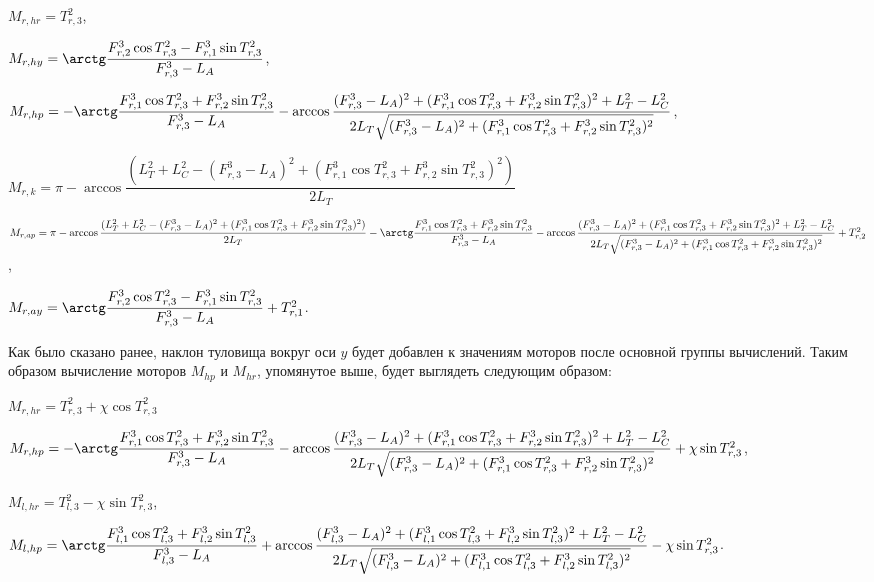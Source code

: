 \begin{center}
$M_{r,hr} = T^{2}_{r,3}$,

$M_{r,hy} = \arctg \dfrac{F^{3}_{r,2} \cos T^{2}_{r,3} - F^{3}_{r,1} \sin T^{2}_{r,3}}{F^{3}_{r,3} - L_{A}}$,

$M_{r,hp} = -\arctg \dfrac{  F^{3}_{r,1} \cos T^{2}_{r,3} + F^{3}_{r,2} \sin T^{2}_{r,3}  }{  F^{3}_{r,3} - L_{A}  } - \arccos \dfrac{  (F^{3}_{r,3} - L_{A})^{2} + (F^{3}_{r,1} \cos T^{2}_{r,3} + F^{3}_{r,2} \sin T^{2}_{r,3}) ^ {2}  + L_{T}^{2} - L_{C} ^ 2 }{ 2 L_{T} \sqrt{(F^{3}_{r,3} - L_{A})^{2} + (F^{3}_{r,1} \cos T^{2}_{r,3} + F^{3}_{r,2} \sin T^{2}_{r,3}) ^ {2}}}$,

$M_{r,k} = \pi - \arccos \dfrac{(L_{T} ^ {2} + L_{C} ^ {2} - (F^{3}_{r,3} - L_{A})^{2} + (F^{3}_{r,1} \cos T^{2}_{r,3} + F^{3}_{r,2} \sin T^{2}_{r,3}) ^ {2})} {2 L_{T}} $

$M_{r,ap} = \pi - \arccos \dfrac{(L_{T} ^ {2} + L_{C} ^ {2} - (F^{3}_{r,3} - L_{A})^{2} + (F^{3}_{r,1} \cos T^{2}_{r,3} + F^{3}_{r,2} \sin T^{2}_{r,3}) ^ {2})} {2 L_{T}} -\arctg \dfrac{  F^{3}_{r,1} \cos T^{2}_{r,3} + F^{3}_{r,2} \sin T^{2}_{r,3}  }{  F^{3}_{r,3} - L_{A}  } - \arccos \dfrac{  (F^{3}_{r,3} - L_{A})^{2} + (F^{3}_{r,1} \cos T^{2}_{r,3} + F^{3}_{r,2} \sin T^{2}_{r,3}) ^ {2}  + L_{T}^{2} - L_{C} ^ 2 }{ 2 L_{T} \sqrt{(F^{3}_{r,3} - L_{A})^{2} + (F^{3}_{r,1} \cos T^{2}_{r,3} + F^{3}_{r,2} \sin T^{2}_{r,3}) ^ {2}}} + T^{2}_{r,2}$,

$M_{r,ay} = \arctg \dfrac{F^{3}_{r,2} \cos T^{2}_{r,3} - F^{3}_{r,1} \sin T^{2}_{r,3}}{F^{3}_{r,3} - L_{A}} + T^{2}_{r,1}$.
\end{center}

Как было сказано ранее, наклон туловища вокруг оси $y$ будет добавлен к значениям моторов после основной группы вычислений. Таким образом вычисление моторов $M_{hp}$ и $M_{hr}$, упомянутое выше, будет выглядеть следующим образом:

\begin{center}
$M_{r,hr} = T^{2}_{r,3} + \chi \cos T^{2}_{r,3}$

$M_{r,hp} = -\arctg \dfrac{  F^{3}_{r,1} \cos T^{2}_{r,3} + F^{3}_{r,2} \sin T^{2}_{r,3}  }{  F^{3}_{r,3} - L_{A}  } - \arccos \dfrac{  (F^{3}_{r,3} - L_{A})^{2} + (F^{3}_{r,1} \cos T^{2}_{r,3} + F^{3}_{r,2} \sin T^{2}_{r,3}) ^ {2}  + L_{T}^{2} - L_{C} ^ 2 }{ 2 L_{T} \sqrt{(F^{3}_{r,3} - L_{A})^{2} + (F^{3}_{r,1} \cos T^{2}_{r,3} + F^{3}_{r,2} \sin T^{2}_{r,3}) ^ {2}}} + \chi \sin T^{2}_{r,3}$,

$M_{l,hr} = T^{2}_{l,3} - \chi \sin T^{2}_{r,3}$,

$M_{l,hp} = \arctg \dfrac{  F^{3}_{l,1} \cos T^{2}_{l,3} + F^{3}_{l,2} \sin T^{2}_{l,3}  }{  F^{3}_{l,3} - L_{A}  } + \arccos \dfrac{  (F^{3}_{l,3} - L_{A})^{2} + (F^{3}_{l,1} \cos T^{2}_{l,3} + F^{3}_{l,2} \sin T^{2}_{l,3}) ^ {2}  + L_{T}^{2} - L_{C} ^ 2 }{ 2 L_{T} \sqrt{(F^{3}_{l,3} - L_{A})^{2} + (F^{3}_{l,1} \cos T^{2}_{l,3} + F^{3}_{l,2} \sin T^{2}_{l,3}) ^ {2}}} - \chi \sin T^{2}_{r,3}$.
\end{center}


